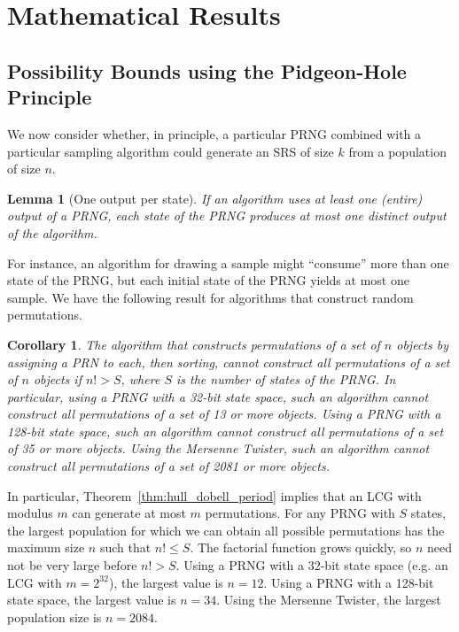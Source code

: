 \documentclass[12pt]{article}
\newtheorem{lemma}[theorem]{Lemma}
\newtheorem{corollary}[theorem]{Corollary}
\begin{document}
\section{Mathematical Results}
\subsection{Possibility Bounds using the Pidgeon-Hole Principle}
We now consider whether, in principle, a particular PRNG combined with a particular sampling algorithm could generate an SRS of size $k$ from a population of size $n$.


\begin{lemma}[One output per state]
If an algorithm uses at least one (entire) output of a PRNG, each state of the PRNG produces at most one distinct output of the algorithm.
\end{lemma}

For instance, an algorithm for drawing a sample might ``consume'' more than one state of the PRNG, but each initial state of the PRNG yields at most one sample.
We have the following result for algorithms that construct random permutations.

\begin{corollary}
The algorithm that constructs permutations of a set of $n$ objects by assigning a PRN to each, then sorting, cannot construct all permutations of a set of $n$ objects if $n! > S$, where $S$ is the number of states of the PRNG. 
In particular, using a PRNG with a 32-bit state space, such an algorithm cannot construct all permutations of a set of 13 or more objects.
Using a PRNG with a 128-bit state space, such an algorithm cannot construct all permutations of a set of 35 or more objects.
Using the Mersenne Twister, such an algorithm cannot construct all permutations of a set of 2081 or more objects.
\end{corollary}

In particular, Theorem~\ref{thm:hull_dobell_period} implies that an LCG with modulus $m$ can generate at most $m$ permutations.
For any PRNG with $S$ states, the largest population for which we can obtain all possible permutations has the maximum size $n$ such that $n! \leq S$.
The factorial function grows quickly, so $n$ need not be very large before $n! > S$.
Using a PRNG with a 32-bit state space (e.g. an LCG with $m=2^{32}$), the largest value is $n=12$.
Using a PRNG with a 128-bit state space, the largest value is $n=34$.
Using the Mersenne Twister, the largest population size is $n=2084$.
\end{document}

